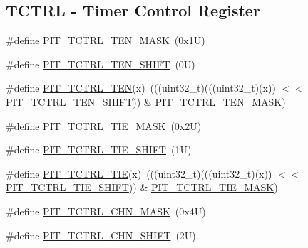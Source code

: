 \subsection*{T\+C\+T\+RL -\/ Timer Control Register}
\begin{DoxyCompactItemize}
\item 
\#define \mbox{\hyperlink{group___p_i_t___register___masks_ga1099670711f996f5fa84e33bbfe794b2}{P\+I\+T\+\_\+\+T\+C\+T\+R\+L\+\_\+\+T\+E\+N\+\_\+\+M\+A\+SK}}~(0x1\+U)
\item 
\#define \mbox{\hyperlink{group___p_i_t___register___masks_ga0080137ff0378087f08cc12fd10b3e1f}{P\+I\+T\+\_\+\+T\+C\+T\+R\+L\+\_\+\+T\+E\+N\+\_\+\+S\+H\+I\+FT}}~(0\+U)
\item 
\#define \mbox{\hyperlink{group___p_i_t___register___masks_gaecd36aa22b2758d6c39b6b2df234e3a8}{P\+I\+T\+\_\+\+T\+C\+T\+R\+L\+\_\+\+T\+EN}}(x)~(((uint32\+\_\+t)(((uint32\+\_\+t)(x)) $<$$<$ \mbox{\hyperlink{group___p_i_t___register___masks_ga0080137ff0378087f08cc12fd10b3e1f}{P\+I\+T\+\_\+\+T\+C\+T\+R\+L\+\_\+\+T\+E\+N\+\_\+\+S\+H\+I\+FT}})) \& \mbox{\hyperlink{group___p_i_t___register___masks_ga1099670711f996f5fa84e33bbfe794b2}{P\+I\+T\+\_\+\+T\+C\+T\+R\+L\+\_\+\+T\+E\+N\+\_\+\+M\+A\+SK}})
\item 
\#define \mbox{\hyperlink{group___p_i_t___register___masks_ga99639aabcac1d6042d14e7893d00bf67}{P\+I\+T\+\_\+\+T\+C\+T\+R\+L\+\_\+\+T\+I\+E\+\_\+\+M\+A\+SK}}~(0x2\+U)
\item 
\#define \mbox{\hyperlink{group___p_i_t___register___masks_gae21aee9e81741a924c9f2824fbc5775b}{P\+I\+T\+\_\+\+T\+C\+T\+R\+L\+\_\+\+T\+I\+E\+\_\+\+S\+H\+I\+FT}}~(1\+U)
\item 
\#define \mbox{\hyperlink{group___p_i_t___register___masks_gaa39036db7a5f8baae6f986b5809d054c}{P\+I\+T\+\_\+\+T\+C\+T\+R\+L\+\_\+\+T\+IE}}(x)~(((uint32\+\_\+t)(((uint32\+\_\+t)(x)) $<$$<$ \mbox{\hyperlink{group___p_i_t___register___masks_gae21aee9e81741a924c9f2824fbc5775b}{P\+I\+T\+\_\+\+T\+C\+T\+R\+L\+\_\+\+T\+I\+E\+\_\+\+S\+H\+I\+FT}})) \& \mbox{\hyperlink{group___p_i_t___register___masks_ga99639aabcac1d6042d14e7893d00bf67}{P\+I\+T\+\_\+\+T\+C\+T\+R\+L\+\_\+\+T\+I\+E\+\_\+\+M\+A\+SK}})
\item 
\#define \mbox{\hyperlink{group___p_i_t___register___masks_ga734e2e947c649d50b9ca46405e451c2b}{P\+I\+T\+\_\+\+T\+C\+T\+R\+L\+\_\+\+C\+H\+N\+\_\+\+M\+A\+SK}}~(0x4\+U)
\item 
\#define \mbox{\hyperlink{group___p_i_t___register___masks_ga9a1c8aa25a05c9b2c9503a003fa8d24d}{P\+I\+T\+\_\+\+T\+C\+T\+R\+L\+\_\+\+C\+H\+N\+\_\+\+S\+H\+I\+FT}}~(2\+U)

\end{DoxyCompactItemize}

